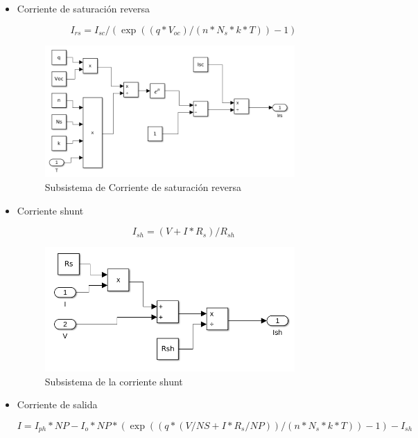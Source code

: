 \documentclass[a4paper,12pt]{article}
\begin{document}
\begin{itemize}
		\item Corriente de saturación reversa
		
			\begin{equation*}
				I_{rs} = I_{sc} / (\exp((q*V_{oc})/(n*N_s*k*T ))-1)
			\end{equation*}
			
			\begin{figure}[htb]
				\centering
				\includegraphics[width=0.9\textwidth]{./imagenes/simulink5.png}
				\caption{Subsistema de Corriente de saturación reversa}
			\end{figure}
		
		\item Corriente shunt
		
			\begin{equation*}
				I_{sh} = (V +I*R_s)/R_{sh}
			\end{equation*}
			
			\begin{figure}[htb]
				\centering
				\includegraphics[width=0.9\textwidth]{./imagenes/simulink6.png}
				\caption{Subsistema de la corriente shunt}
			\end{figure} 
		
		\item Corriente de salida
		
			\begin{equation*}
				I = I_{ph}*NP - I_o * NP *(\exp((q*(V/NS + I*R_s/NP))/(n*N_s*k*T))-1)-I_{sh}
			\end{equation*}
			

\end{itemize}
\end{document}
